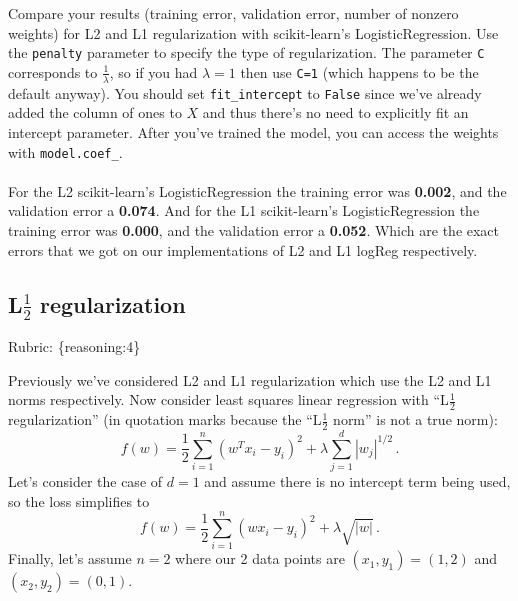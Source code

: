 \documentclass{article}
\def\rubric#1{\gre{Rubric: \{#1\}}}{}
\def\gre#1{{\color{gre}#1}}
\def\ans#1{{\color{ans}#1}}
\begin{document}
Compare your results (training error, validation error, number of nonzero weights) for L2 and L1 regularization with scikit-learn's LogisticRegression. Use the
\texttt{penalty} parameter to specify the type of regularization. The parameter \texttt{C} corresponds to $\frac{1}{\lambda}$, so if
you had $\lambda=1$ then use \texttt{C=1} (which happens to be the default anyway).
You should set \texttt{fit\string_intercept} to \texttt{False} since we've already added the column of ones to $X$ and thus
there's no need to explicitly fit an intercept parameter. After you've trained the model, you can access the weights
with \texttt{model.coef\string_}. \\ \\
\ans{
    For the L2 scikit-learn's LogisticRegression the training error was \textbf{0.002}, and the validation 
    error a \textbf{0.074}. And for the L1 scikit-learn's LogisticRegression the training error 
    was \textbf{0.000}, and the validation error a \textbf{0.052}. Which are the exact errors 
    that we got on our implementations of L2 and L1 logReg respectively.
}



\subsection{L$\frac12$ regularization}
\rubric{reasoning:4}

Previously we've considered L2 and L1 regularization which use the L2 and L1 norms respectively. Now consider
least squares linear regression with ``L$\frac12$ regularization'' (in quotation marks because the ``L$\frac12$ norm'' is not a true norm):
\[
f(w) = \frac{1}{2} \sum_{i=1}^n (w^Tx_i - y_i)^2 + \lambda \sum_{j=1}^d |w_j|^{1/2} \, .
\]
Let's consider the case of $d=1$ and
assume  there is no intercept term being used, so the loss simplifies to
\[
f(w) = \frac{1}{2} \sum_{i=1}^n (wx_i - y_i)^2 + \lambda \sqrt{|w|} \, .
\]
Finally, let's assume $n=2$
where our 2 data points are $(x_1,y_1)=(1,2)$ and $(x_2,y_2)=(0,1)$. 
\end{document}
